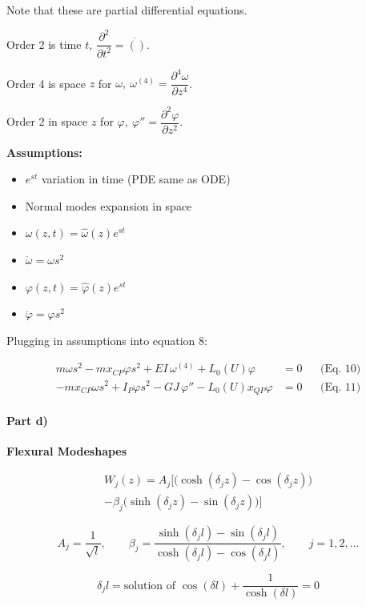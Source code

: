 \documentclass[11pt]{article}
\begin{document}
Note that these are partial differential equations.

Order 2 is time \(t\),
\(\dfrac{\partial^{2}}{\partial t^{2}} = \ddot{()}\).

Order 4 is space \(z\) for
\(\omega,\ \omega^{(4)} = \dfrac{\partial^{4}\omega}{\partial z^{4}}\).

Order 2 in space \(z\) for
\(\varphi,\ \varphi'' = \dfrac{\partial^{2}\varphi}{\partial z^{2}}\).

\textbf{Assumptions:}

\begin{itemize}
\item
  \(e^{st}\) variation in time (PDE same as ODE)
\item
  Normal modes expansion in space
\item
  \(\omega(z,t) = \widehat{\omega}(z)e^{st}\)
\item
  \(\ddot{\omega} = \omega s^{2}\)
\item
  \(\varphi(z,t) = \widehat{\varphi}(z)e^{st}\)
\item
  \(\ddot{\varphi} = \varphi s^{2}\)
\end{itemize}

Plugging in assumptions into equation 8:

\begin{align}
m\omega s^{2} - m x_{CP}\varphi s^{2} + EI\,\omega^{(4)} + L_{0}(U)\varphi &= 0 &&\text{(Eq. 10)}\\
- m x_{CP}\omega s^{2} + I_{P}\varphi s^{2} - GJ\,\varphi'' - L_{0}(U)x_{QP}\varphi &= 0 &&\text{(Eq. 11)}
\end{align}

\paragraph{Part d)}\label{part-d}

\textbf{Flexural Modeshapes}

\begin{multline}
W_{j}(z) =
A_{j}\Big[
\big( \cosh(\delta_{j}z) - \cos(\delta_{j}z) \big)
\\
- \beta_{j}\big( \sinh(\delta_{j}z) - \sin(\delta_{j}z) \big)
\Big]
\end{multline}

\[
A_{j} = \frac{1}{\sqrt{l}},\qquad
\beta_{j} =
\frac{\sinh(\delta_{j}l) - \sin(\delta_{j}l)}
     {\cosh(\delta_{j}l) - \cos(\delta_{j}l)},
\qquad j = 1,2,\ldots
\]

\[
\delta_{j}l = \text{solution of } \cos(\delta l) +
\frac{1}{\cosh(\delta l)} = 0
\]
\end{document}
